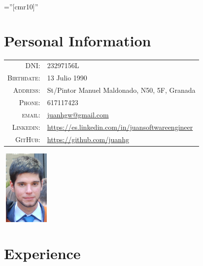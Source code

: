 \documentclass[a4paper,10pt]{article} %
\begin{document}
\font\fb=''[cmr10]'' %


\par{\bigskip\par} %

\section{Personal Information}

\noindent\begin{minipage}{0.3\textwidth}%
\begin{tabular}{rl}
\textsc{DNI:} & 23297156L \\
\textsc{Birthdate:} &  13 Julio 1990 \\
\textsc{Address:} & St/Pintor Manuel Maldonado, N50, 5F, Granada \\
\textsc{Phone:} & 617117423\\
\textsc{email:} & \href{mailto:juanhgw@gmail.com}{juanhgw@gmail.com} \\
\textsc{Linkedin:} & \url{https://es.linkedin.com/in/juansoftwareengineer} \\
\textsc{GitHub:} & \url{https://github.com/juanhg}
\end{tabular}
\end{minipage}%
\hfill%
\begin{minipage}{0.6\textwidth}\raggedleft
\includegraphics[width=24mm, height=37mm]{pictures/photo2}
\end{minipage}



\section{Experience}
\end{document}
